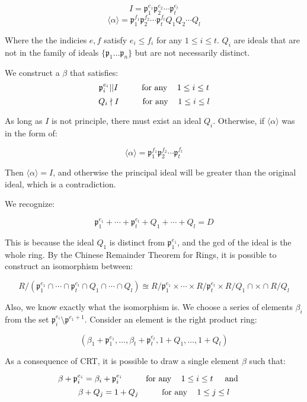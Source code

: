 \documentclass{article}
\newcommand{\textAnd}{
    \hspace{5mm}
    \textrm{and}
    \hspace{5mm}
}
\newcommand{\textForany}{
    \hspace{10mm}
    \textrm{for any }
    \hspace{3mm}
}
\newcommand{\<}{{{
    \langle
}}}
\def\>{{{
    \rangle
}}}
\newcommand{\pideal}{
    {{\mathfrak{p}}}
}
\begin{document}
    \newcommand\ppow[2]{{
        \pideal_{#2}^{{#1}_{#2}}
        }
    }
    \[
        I = \ppow{e}{1} \ppow{e}{2} \cdots \ppow{e}{t}
    \]
    \[
        \<\alpha\> = \ppow{f}{1} \ppow{f}{2} \cdots \ppow{f}{t} 
        Q_1 Q_2 \cdots Q_l
    \]

    Where the the indicies $e, f$ satisfy $e_i \leq f_i$ 
    for any $1 \leq i \leq t$. $Q_i$ are ideals that are 
    not in the family of ideals $\{\pideal_1 \dots \pideal_n\}$
    but are not necessarily distinct. 
    
    We construct a $\beta$ that satisfies:
    \[
        \ppow{e}{i} || I
        \textForany 
        1 \leq i \leq t
    \]
    \[
        Q_i \nmid I 
        \textForany 
        1 \leq i \leq l
    \]

    As long as $I$ is not principle, there must exist an 
    ideal $Q_i$. Otherwise, if $\<\alpha\>$ was in the form of:

\[
        \<\alpha\> = \ppow{f}{1} \ppow{f}{2} \cdots \ppow{f}{t} 
    \]

    Then $\<\alpha\> = I$, and otherwise the principal ideal will 
    be greater than the original ideal, which is a contradiction. 

    We recognize:

    \[
        \ppow{e}{1} + \cdots + \ppow{e}{t} + Q_1+\cdots + Q_l = D
    \]

    This is because the ideal $Q_1$ is distinct from $\ppow{e}{1}$, 
    and the gcd of the ideal is the whole ring. By the Chinese 
    Remainder Theorem for Rings, it is possible to construct 
    an isomorphism between:

    \[
        R / (\ppow{e}{1} \cap \cdots \cap
        \ppow{e}{t}\cap Q_1 \cap \cdots \cap Q_l)
        \approxeq 
        R / \ppow{e}{1} \times  \cdots \times 
        R/\ppow{e}{t} \times
        R/Q_1 \cap \times \cap R/Q_l
    \]
    
    Also, we know exactly what the isomorphism is. We choose a 
    series of elements $\beta_i$ from the set  
    $\ppow{e}{i}\setminus \pideal^{e_{1}+1}$. Consider 
    an element is the right product ring:

    \[
        (\beta_1+\ppow{e}{1}, \dots, \beta_t+ \ppow{e}{t} 
        , 1+ Q_1, \dots, 1+Q_l)
    \]

    As a consequence of CRT, it is possible to draw a single 
    element $\beta$ such that:

    \[
        \beta + \ppow{e}{i} = \beta_i + \ppow{e}{i} 
        \textForany 1 \leq i \leq t \textAnd 
    \]
\[
    \beta + Q_j = 1+Q_j \textForany 1 \leq j \leq l
\]
\end{document}
